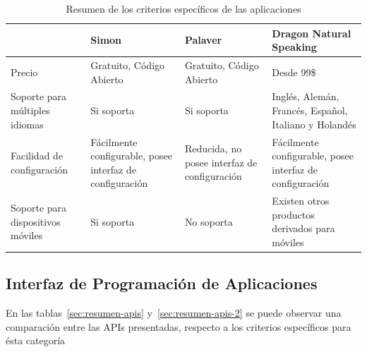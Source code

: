 \begin{table}[H]
\centering
\footnotesize
\begin{tabular}{|p{3.5cm}|p{3.5cm}|p{3.5cm}|p{3.5cm}|}
\hline
                                      &  Simon                                                       &  Palaver                                       & Dragon Natural Speaking \\
\hline
Precio                                & Gratuito, C\'odigo Abierto                                   & Gratuito, C\'odigo Abierto                     & Desde 99\$  \\
Soporte para m\'ultiples idiomas      & Si soporta                                                   & Si soporta                                     & Ingl\'es, Alem\'an, Franc\'es, Espa\~nol, Italiano y Holand\'es \\
Facilidad de configuraci\'on          & F\'acilmente configurable, posee interfaz de configuraci\'on & Reducida, no posee interfaz de configuraci\'on & F\'acilmente configurable, posee interfaz de configuraci\'on \\
Soporte para dispositivos m\'oviles   & Si soporta                                                   & No soporta                                     & Existen otros productos derivados para m\'oviles \\
\hline
\end{tabular}
\caption{Resumen de los criterios espec\'ificos de las aplicaciones}
\label{sec:resumen-aplicaciones}
\end{table}

\subsection{Interfaz de Programaci\'on de Aplicaciones}

En las tablas~\ref{sec:resumen-apis} y~\ref{sec:resumen-apis-2} se puede observar una comparaci\'on entre las APIs presentadas, respecto a los criterios espec\'ificos
para \'esta categor\'ia


